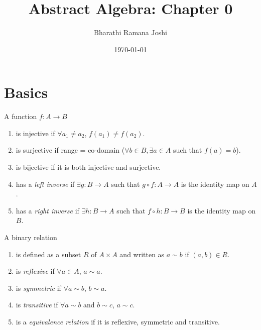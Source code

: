 \documentclass[titlepage, 12pt]{article}
\begin{document}
\title{Abstract Algebra: Chapter 0}

\author{Bharathi Ramana Joshi}

\date{\today}

\maketitle

\tableofcontents

\newpage

\section{Basics}
A function $f:A\rightarrow B$
\begin{enumerate}

	\item is injective if $\forall a_1\neq a_2$,
		$f(a_1)\neq f(a_2)$.

	\item is surjective if range = co-domain
		($\forall b\in B, \exists a\in A$ such that $f(a) = b$).

	\item is bijective if it is both injective and
		surjective.

	\item has a \textit{left inverse} if $\exists g:B\rightarrow A$ such that
		$g\circ f:A\rightarrow A$ is the identity map on $A$.

	\item has a \textit{right inverse} if $\exists h:B\rightarrow A$ such that
		$f\circ h:B\rightarrow B$ is the identity map on $B$.

\end{enumerate}

A binary relation

\begin{enumerate}

	\item is defined as a subset $R$ of $A\times A$ and written as $a\sim b$ if
		$(a, b)\in R$.

	\item is \textit{reflexive} if $\forall a\in A$, $a\sim a$.

	\item is \textit{symmetric} if $\forall a\sim b$, $b\sim a$.

	\item is \textit{transitive} if $\forall a\sim b$ and $b\sim c$,
		$a\sim c$.
 
	\item is a \textit{equivalence relation} if it is reflexive, symmetric and
		transitive.

\end{enumerate}
\end{document}
